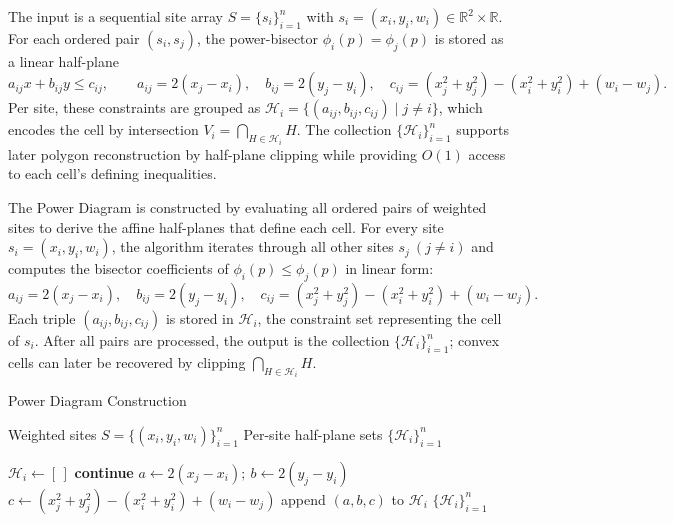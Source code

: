 \documentclass{article}
\begin{document}

The input is a sequential site array \(S=\{s_i\}_{i=1}^n\) with
\(s_i=(x_i,y_i,w_i)\in\mathbb{R}^2\times\mathbb{R}\).
For each ordered pair \((s_i,s_j)\), the power-bisector
\(\phi_i(p)=\phi_j(p)\) is stored as a linear half-plane
\[
a_{ij}x + b_{ij}y \le c_{ij},\qquad
a_{ij}=2(x_j-x_i),\quad
b_{ij}=2(y_j-y_i),\quad
c_{ij}=(x_j^2+y_j^2)-(x_i^2+y_i^2)+(w_i-w_j).
\]
Per site, these constraints are grouped as
\(\mathcal{H}_i=\{(a_{ij},b_{ij},c_{ij})\mid j\ne i\}\),
which encodes the cell by intersection \(V_i=\bigcap_{H\in\mathcal{H}_i}H\).
The collection \(\{\mathcal{H}_i\}_{i=1}^n\) supports later polygon
reconstruction by half-plane clipping while providing \(O(1)\) access to
each cell’s defining inequalities.


The Power Diagram is constructed by evaluating all ordered pairs of weighted sites to derive the affine half-planes that define each cell.  
For every site \(s_i=(x_i,y_i,w_i)\), the algorithm iterates through all other sites \(s_j\ (j\neq i)\) and computes the bisector coefficients of \(\phi_i(p)\le\phi_j(p)\) in linear form:
\[
a_{ij}=2(x_j-x_i),\quad
b_{ij}=2(y_j-y_i),\quad
c_{ij}=(x_j^2+y_j^2)-(x_i^2+y_i^2)+(w_i-w_j).
\]
Each triple \((a_{ij},b_{ij},c_{ij})\) is stored in \(\mathcal{H}_i\), the constraint set representing the cell of \(s_i\).  
After all pairs are processed, the output is the collection \(\{\mathcal{H}_i\}_{i=1}^n\); convex cells can later be recovered by clipping \(\bigcap_{H\in\mathcal{H}_i}H\).

\begin{algorithm}[H]
\caption{Power Diagram Construction}
\begin{algorithmic}[1]
\Require Weighted sites \(S=\{(x_i,y_i,w_i)\}_{i=1}^n\)
\Ensure Per-site half-plane sets \(\{\mathcal{H}_i\}_{i=1}^n\)

    \State \(\mathcal{H}_i\gets[\,]\)
         \State \textbf{continue} \EndIf
        \State \(a\gets2(x_j-x_i);\ b\gets2(y_j-y_i)\)
        \State \(c\gets(x_j^2+y_j^2)-(x_i^2+y_i^2)+(w_i-w_j)\)
        \State append \((a,b,c)\) to \(\mathcal{H}_i\)
    \EndFor
\EndFor
\State \Return \(\{\mathcal{H}_i\}_{i=1}^n\)
\end{algorithmic}
\end{algorithm}


\end{document}
